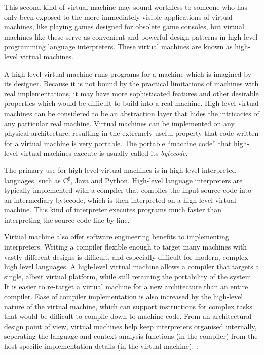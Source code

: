 		This second kind of virtual machine may sound worthless to someone who has only been exposed to the more immediately visible applications of virtual machines, like playing games designed for obsolete game consoles, but virtual machines like these serve as convenient and powerful design patterns in high-level programming language interpreters. These virtual machines are known as high-level virtual machines.
		
		A high level virtual machine runs programs for a machine which is imagined by its designer. Because it is not bound by the practical limitations of machines with real implementations, it may have more sophisticated features and other desirable properties which would be difficult to build into a real machine. High-level virtual machines can be considered to be an abstraction layer that hides the intricacies of any particular real machine. Virtual machines can be implemented on any physical architecture, resulting in the extremely useful property that code written for a virtual machine is very portable. The portable ``machine code'' that high-level virtual machines execute is usually called its \emph{bytecode}. 
		
		The primary use for high-level virtual machines is in high-level interpreted languages, such as C$^\sharp$, Java and Python. High-level language interpreters are typically implemented with a compiler that compiles the input source code into an intermediary bytecode, which is then interpreted on a high level virtual machine. This kind of interpreter executes programs much faster than interpreting the source code line-by-line.
		
		Virtual machine also offer software engineering benefits to implementing interpreters. Writing a compiler flexible enough to target many machines with vastly different designs is difficult, and especially difficult for modern, complex high level languages. A high-level virtual machine allows a compiler that targets a single, albeit virtual platform, while still retaining the portability of the system. It is easier to re-target a virtual machine for a new architecture than an entire compiler. Ease of compiler implementation is also increased by the high-level nature of the virtual machine, which can support instructions for complex tasks that would be difficult to compile down to machine code. From an architectural design point of view, virtual machines help keep interpreters organised internally, seperating the language and context analysis functions (in the compiler) from the host-specific implementation details (in the virtual machine). \citep{structureinterpreters}.
		
